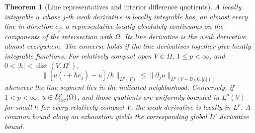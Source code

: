\documentclass[11pt,oneside,openany]{book}
\newtheorem{theorem}{Theorem}[chapter]
\theoremstyle{definition}
\theoremstyle{remark}
\begin{document}
\begin{theorem}[Line representatives and interior difference quotients]
\label{p102:U4-05}
A locally integrable \(u\) whose \(j\)-th weak derivative is locally integrable has, on almost every line in direction \(e_j\), a representative locally absolutely continuous on the components of the intersection with \(\Omega\). Its line derivative is the weak derivative almost everywhere. The converse holds if the line derivatives together give locally integrable functions. For relatively compact open \(V\Subset\Omega\), \(1\leq p<\infty\), and \(0<|h|<\operatorname{dist}(V,\Omega^c)\),
\[
 \|[u(\cdot+he_j)-u]/h\|_{L^p(V)}
 \leq \|\partial_j u\|_{L^p(V+B(0,|h|))}
\]
whenever the line segment lies in the indicated neighborhood. Conversely, if \(1<p<\infty\), \(u\in L^p_{\rm loc}(\Omega)\), and those quotients are uniformly bounded in \(L^p(V)\) for small \(h\) for every relatively compact \(V\), the weak derivative is locally in \(L^p\). A common bound along an exhaustion yields the corresponding global \(L^p\) derivative bound.
\end{theorem}
\end{document}
